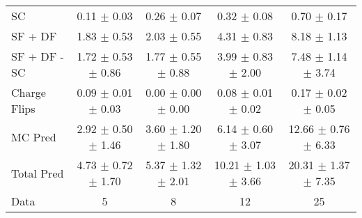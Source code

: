 \begin{tabular}{l|cccc}
                                 SC &  0.11 $\pm$  0.03 &  0.26 $\pm$  0.07 &  0.32 $\pm$  0.08 &  0.70 $\pm$  0.17 \\
                            SF + DF &  1.83 $\pm$  0.53 &  2.03 $\pm$  0.55 &  4.31 $\pm$  0.83 &  8.18 $\pm$  1.13 \\
\hline
                       SF + DF - SC &  1.72 $\pm$  0.53 $\pm$  0.86 &  1.77 $\pm$  0.55 $\pm$  0.88 &  3.99 $\pm$  0.83 $\pm$  2.00 &  7.48 $\pm$  1.14 $\pm$  3.74 \\
\hline\hline
                       Charge Flips &  0.09 $\pm$  0.01 $\pm$  0.03 &  0.00 $\pm$  0.00 $\pm$  0.00 &  0.08 $\pm$  0.01 $\pm$  0.02 &  0.17 $\pm$  0.02 $\pm$  0.05 \\
\hline
                            MC Pred &  2.92 $\pm$  0.50 $\pm$  1.46 &  3.60 $\pm$  1.20 $\pm$  1.80 &  6.14 $\pm$  0.60 $\pm$  3.07 & 12.66 $\pm$  0.76 $\pm$  6.33 \\
\hline
                         Total Pred &  4.73 $\pm$  0.72 $\pm$  1.70 &  5.37 $\pm$  1.32 $\pm$  2.01 & 10.21 $\pm$  1.03 $\pm$  3.66 & 20.31 $\pm$  1.37 $\pm$  7.35 \\
\hline\hline
                               Data &     5 &     8 &    12 &    25 \\
\hline\hline
\end{tabular}


